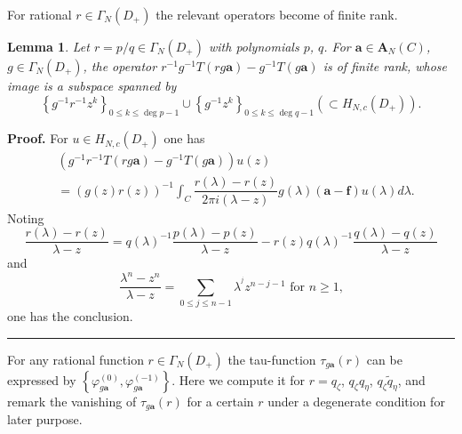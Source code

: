 \documentclass[a4paper]{article}%
\newtheorem{lemma}{Lemma}
\newenvironment{proof}[1][Proof]{\noindent\textbf{#1.} }{\ \rule{0.5em}{0.5em}}
\begin{document}
For rational $r\in\Gamma_{N}\left(  D_{+}\right)  $ the relevant operators
become of finite rank.

\begin{lemma}
\label{l2-10}Let $r=p/q\in\Gamma_{N}\left(  D_{+}\right)  $ with polynomials
$p$, $q$. For $\boldsymbol{a}\in\boldsymbol{A}_{N}\left(  C\right)  $,
$g\in\Gamma_{N}\left(  D_{+}\right)  $, the operator $r^{-1}g^{-1}T\left(
rg\boldsymbol{a}\right)  -g^{-1}T\left(  g\boldsymbol{a}\right)  $ is of
finite rank, whose image is a subspace spanned by
\[
\left\{  g^{-1}r^{-1}z^{k}\right\}  _{0\leq k\leq\deg p-1}\cup\left\{
g^{-1}z^{k}\right\}  _{0\leq k\leq\deg q-1}\left(  \subset H_{N,c}\left(
D_{+}\right)  \right)  \text{.}%
\]

\end{lemma}

\begin{proof}
For $u\in H_{N,c}\left(  D_{+}\right)  $ one has
\begin{align*}
&  \left(  g^{-1}r^{-1}T\left(  rg\boldsymbol{a}\right)  -g^{-1}T\left(
g\boldsymbol{a}\right)  \right)  u\left(  z\right) \\
&  =\left(  g\left(  z\right)  r\left(  z\right)  \right)  ^{-1}\int_{C}%
\dfrac{r\left(  \lambda\right)  -r\left(  z\right)  }{2\pi i\left(
\lambda-z\right)  }g\left(  \lambda\right)  \left(  \boldsymbol{a}%
-\boldsymbol{f}\right)  u\left(  \lambda\right)  d\lambda\text{.}%
\end{align*}
Noting%
\[
\dfrac{r\left(  \lambda\right)  -r\left(  z\right)  }{\lambda-z}=q\left(
\lambda\right)  ^{-1}\dfrac{p\left(  \lambda\right)  -p\left(  z\right)
}{\lambda-z}-r\left(  z\right)  q\left(  \lambda\right)  ^{-1}\dfrac{q\left(
\lambda\right)  -q\left(  z\right)  }{\lambda-z}%
\]
and%
\[
\dfrac{\lambda^{n}-z^{n}}{\lambda-z}=\sum_{0\leq j\leq n-1}\lambda^{^{j}%
}z^{n-j-1}\text{ \ for }n\geq1\text{,}%
\]
one has the conclusion.\bigskip
\end{proof}

For any rational function $r\in\Gamma_{N}\left(  D_{+}\right)  $ the
tau-function $\tau_{g\boldsymbol{a}}\left(  r\right)  $ can be expressed by
$\left\{  \varphi_{g\boldsymbol{a}}^{\left(  0\right)  },\varphi
_{g\boldsymbol{a}}^{\left(  -1\right)  }\right\}  $. Here we compute it for
$r=q_{\zeta}$, $q_{\zeta}q_{\eta}$, $q_{\zeta}\widetilde{q}_{\eta}$, and
remark the vanishing of $\tau_{g\boldsymbol{a}}\left(  r\right)  $ for a
certain $r$ under a degenerate condition for later purpose.
\end{document}
